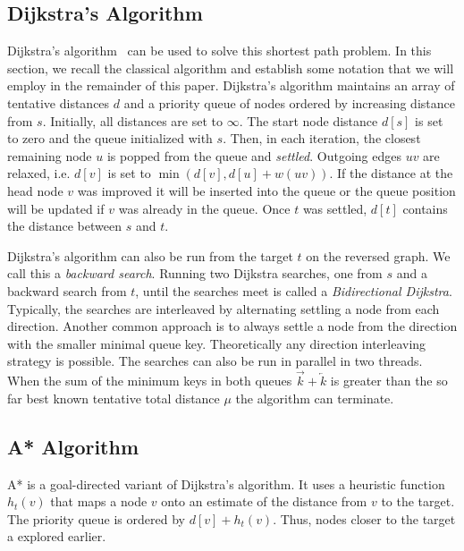 \documentclass[manuscript,review]{acmart}
\begin{document}
\subsection{Dijkstra's Algorithm}

Dijkstra's algorithm~\cite{d-ntpcg-59} can be used to solve this shortest path problem.
In this section, we recall the classical algorithm and establish some notation that we will employ in the remainder of this paper.
Dijkstra's algorithm maintains an array of tentative distances $d$ and a priority queue of nodes ordered by increasing distance from $s$.
Initially, all distances are set to $\infty$.
The start node distance $d[s]$ is set to zero and the queue initialized with $s$.
Then, in each iteration, the closest remaining node $u$ is popped from the queue and \emph{settled}.
Outgoing edges $uv$ are relaxed, i.e. $d[v]$ is set to $\min(d[v], d[u] + w(uv))$.
If the distance at the head node $v$ was improved it will be inserted into the queue or the queue position will be updated if $v$ was already in the queue.
Once $t$ was settled, $d[t]$ contains the distance between $s$ and $t$.

Dijkstra's algorithm can also be run from the target $t$ on the reversed graph.
We call this a \emph{backward search}.
Running two Dijkstra searches, one from $s$ and a backward search from $t$, until the searches meet is called a \emph{Bidirectional Dijkstra}.
Typically, the searches are interleaved by alternating settling a node from each direction.
Another common approach is to always settle a node from the direction with the smaller minimal queue key.
Theoretically any direction interleaving strategy is possible.
The searches can also be run in parallel in two threads.
When the sum of the minimum keys in both queues $\overrightarrow{k} + \overleftarrow{k}$ is greater than the so far best known tentative total distance $\mu$ the algorithm can terminate.

\subsection{A* Algorithm}\label{sec:a_star}

A* is a goal-directed variant of Dijkstra's algorithm.
It uses a heuristic function $h_t(v)$ that maps a node $v$ onto an estimate of the distance from $v$ to the target.
The priority queue is ordered by $d[v] + h_t(v)$.
Thus, nodes closer to the target a explored earlier.
\end{document}
